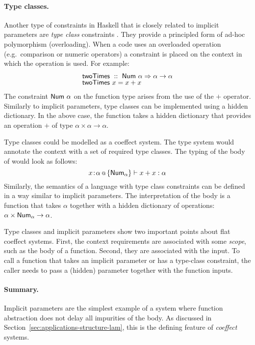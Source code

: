 \paragraph{Type classes.}
Another type of constraints in Haskell that is closely related to implicit parameters are 
\emph{type class} constraints \cite{app-type-classes}. They provide a principled form of ad-hoc
polymorphism (overloading). When a code uses an overloaded operation (e.g.~comparison or numeric 
operators) a constraint is placed on the context in which the operation is used. For example:
%
\begin{equation*}
\begin{array}{l}
\textnormal{\sffamily twoTimes}~::~\textnormal{\sffamily Num}~\alpha \Rightarrow \alpha \rightarrow \alpha \\[-0.25em]
\textnormal{\sffamily twoTimes}~x=x+x
\end{array}
\end{equation*}
%
The constraint $\textnormal{\sffamily Num}~\alpha$ on the function type arises from the use of the $+$ operator. 
Similarly to implicit parameters, type classes can be implemented using a hidden dictionary. In 
the above case, the function  takes a hidden dictionary that provides an operation
$+$ of type $\alpha \times \alpha \rightarrow \alpha$.

Type classes could be modelled as a coeffect system. The type system would annotate the context
with a set of required type classes. The typing of the body of  would look as 
follows:
%
\begin{equation*}
x\!:\!\alpha \,\text{\scriptsize @}\, {{\text{$ \{ \textnormal{\sffamily Num}_\alpha \} $}}} \vdash x + x : \alpha
\end{equation*}
%
Similarly, the semantics of a language with type class constraints can be defined in a way
similar to implicit parameters. The interpretation of the body is a function that takes $\alpha$
together with a hidden dictionary of operations: $\alpha \times \textnormal{\sffamily Num}_\alpha \rightarrow \alpha$.

Type classes and implicit parameters show two important points about flat coeffect systems.
First, the context requirements are associated with some \emph{scope}, such as the body
of a function. Second, they are associated with the input. To call a function that takes an 
implicit parameter or has a type-class constraint, the caller needs to pass a (hidden) parameter
together with the function inputs.

\paragraph{Summary.}
Implicit parameters are the simplest example of a system where function abstraction does not 
delay all impurities of the body. As discussed in Section~\ref{sec:applications-structure-lam},
this is the defining feature of \emph{coeffect} systems. 

